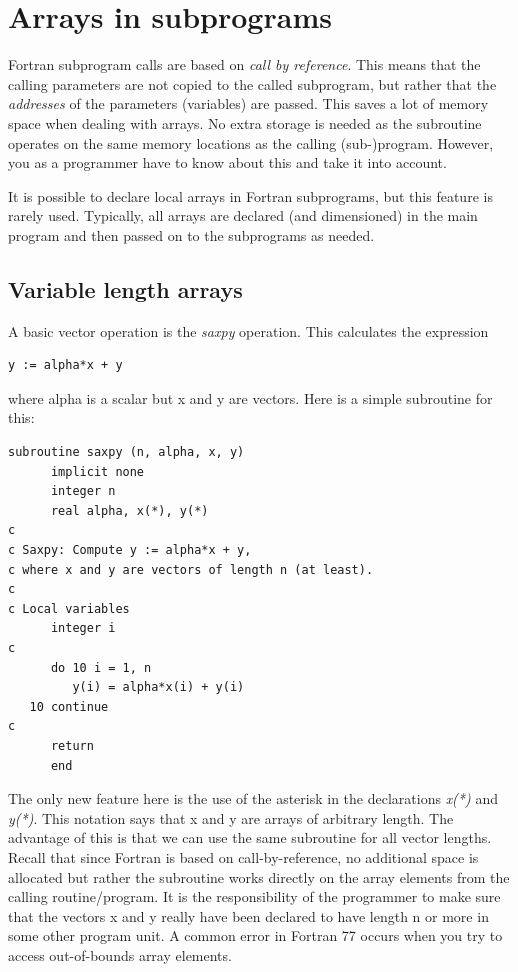 \chapter{Arrays in subprograms}

Fortran subprogram calls are based on \emph{call by reference}. This means that the calling parameters are not copied to the called subprogram, but rather that the \emph{addresses} of the parameters (variables) are passed. This saves a lot of memory space when dealing with arrays. No extra storage is needed as the subroutine operates on the same memory locations as the calling (sub-)program. However, you as a programmer have to know about this and take it into account.

It is possible to declare local arrays in Fortran subprograms, but this feature is rarely used. Typically, all arrays are declared (and dimensioned) in the main program and then passed on to the subprograms as needed.

\section{Variable length arrays}

A basic vector operation is the \emph{saxpy} operation. This calculates the expression

\begin{lstlisting}[style=fortran77]
      y := alpha*x + y
\end{lstlisting}

where alpha is a scalar but x and y are vectors. Here is a simple subroutine for this:

\begin{lstlisting}[style=fortran77]
      subroutine saxpy (n, alpha, x, y)
      implicit none
      integer n
      real alpha, x(*), y(*)
c
c Saxpy: Compute y := alpha*x + y,
c where x and y are vectors of length n (at least).
c
c Local variables
      integer i
c
      do 10 i = 1, n
         y(i) = alpha*x(i) + y(i)
   10 continue
c
      return
      end
\end{lstlisting}

The only new feature here is the use of the asterisk in the declarations \emph{x(*)} and \emph{y(*)}. This notation says that x and y are arrays of arbitrary length. The advantage of this is that we can use the same subroutine for all vector lengths. Recall that since Fortran is based on call-by-reference, no additional space is allocated but rather the subroutine works directly on the array elements from the calling routine/program. It is the responsibility of the programmer to make sure that the vectors x and y really have been declared to have length n or more in some other program unit. A common error in Fortran 77 occurs when you try to access out-of-bounds array elements.

